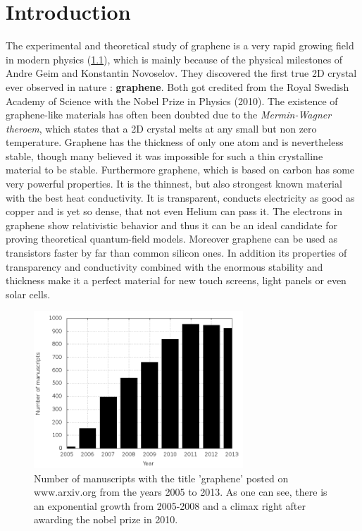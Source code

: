 \chapter{Introduction}
	The experimental and theoretical study of graphene is a very rapid growing field in modern physics (\ref{fig:grapheneManuscripts}), which is mainly because of the physical milestones of Andre Geim and Konstantin Novoselov. They discovered the first true 2D crystal ever observed in nature : \textbf{graphene}. Both got credited from the Royal Swedish Academy of Science with the Nobel Prize in Physics (2010). The existence of graphene-like materials has often been doubted due to the \textit{Mermin-Wagner theroem}, which states that a 2D crystal melts at any small but non zero temperature. Graphene has the thickness of only one atom and is nevertheless stable, though many believed it was impossible for such a thin crystalline material to be stable. Furthermore graphene, which is based on carbon has some very powerful properties. It is the thinnest, but also strongest known material with the best heat conductivity. It is transparent, conducts electricity as good as copper and is yet so dense, that not even Helium can pass it. The electrons in graphene show relativistic behavior and thus it can be an ideal candidate for proving theoretical quantum-field models. Moreover graphene can be used as transistors faster by far than common silicon ones. In addition its properties of transparency and conductivity combined with the enormous stability and thickness make it a perfect material for new touch screens, light panels or even solar cells. \\
	\begin{figure}[H]
		\centering
		\includegraphics[width=0.7\textwidth]{figures/Introduction/grapheneManuscripts.png}
		\caption{Number of manuscripts with the title 'graphene' posted on www.arxiv.org from the years 2005 to 2013. As one can see, there is an exponential growth from 2005-2008 and a climax right after awarding the nobel prize in 2010.}
		\label{fig:grapheneManuscripts}
	\end{figure}
